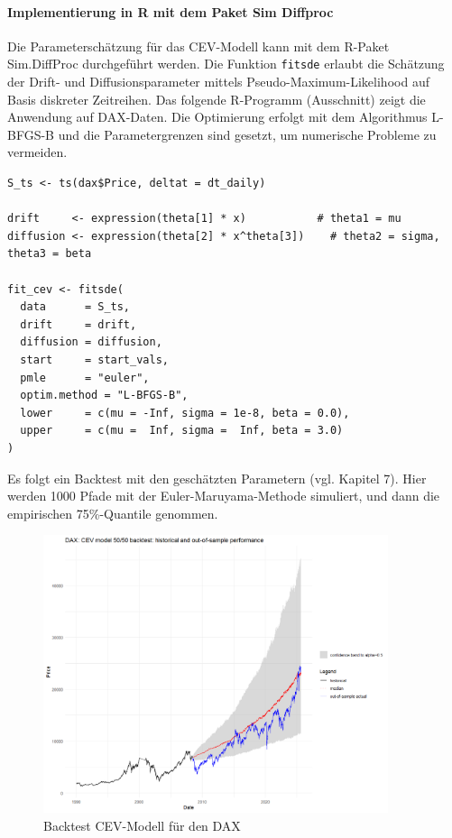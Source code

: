 \paragraph{Implementierung in R mit dem Paket Sim Diffproc}
Die Parameterschätzung für das CEV-Modell kann mit dem R-Paket Sim.DiffProc durchgeführt werden. Die Funktion \texttt{fitsde} erlaubt die Schätzung der Drift- und Diffusionsparameter mittels Pseudo-Maximum-Likelihood auf Basis diskreter Zeitreihen. Das folgende R-Programm (Ausschnitt) zeigt die Anwendung auf DAX-Daten.
Die Optimierung erfolgt mit dem Algorithmus L-BFGS-B und die Parametergrenzen sind gesetzt, um numerische Probleme zu vermeiden.

\begin{lstlisting}
S_ts <- ts(dax$Price, deltat = dt_daily)

drift     <- expression(theta[1] * x)           # theta1 = mu
diffusion <- expression(theta[2] * x^theta[3])    # theta2 = sigma, theta3 = beta

fit_cev <- fitsde(
  data      = S_ts,
  drift     = drift,
  diffusion = diffusion,
  start     = start_vals,
  pmle      = "euler",
  optim.method = "L-BFGS-B",
  lower     = c(mu = -Inf, sigma = 1e-8, beta = 0.0),
  upper     = c(mu =  Inf, sigma =  Inf, beta = 3.0)
)
\end{lstlisting}

Es folgt ein Backtest mit den geschätzten Parametern (vgl. Kapitel 7). Hier werden 1000 Pfade mit der
Euler-Maruyama-Methode simuliert, und dann die empirischen 75\%-Quantile genommen.

\begin{figure}[H]
    \centering
    \includegraphics[width=0.9\textwidth]{images/cev_dax_backtest.png}
    \caption{Backtest CEV-Modell für den DAX}
    \label{fig:cev_dax_backtest}
\end{figure}

